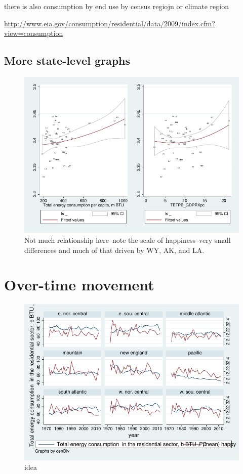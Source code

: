 \documentclass[10pt, letterpaper]{article}
\begin{document}
\begin{spacing}{1.4}
there is also consumption by end use by census regiojn or climate region

\url{http://www.eia.gov/consumption/residential/data/2009/index.cfm?view=consumption}

\subsection{More state-level graphs}

\begin{figure}[H]
 \includegraphics[width=6in]{graphsAndTables/lfTETPBgdpLS.pdf}\centering
\caption{Not much relationship here--note the scale of happiness--very small
  differences and much of that driven by WY, AK, and LA.}\label{lfTETPBgdpLS}
\end{figure}

\section{Over-time movement}

\begin{figure}[H]
 \includegraphics[width=6in]{graphsAndTables/cenDivLsYr.pdf}\centering
\caption{idea}\label{cenDivLsYr}
 \end{figure}


\end{spacing}
\end{document}
